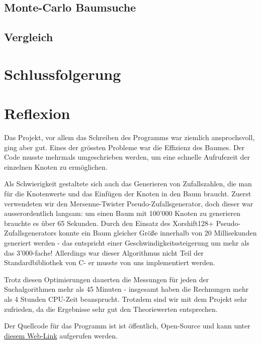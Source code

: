 \documentclass[a4paper,11pt]{article}
\newcommand{\CC}{C\nolinebreak\hspace{-.05em}\raisebox{.4ex}{\tiny\bf +}\nolinebreak\hspace{-.10em}\raisebox{.4ex}{\tiny\bf +}\hspace{.1em}}
\begin{document}
\subsection{Monte-Carlo Baumsuche}

\subsection{Vergleich}

\section{Schlussfolgerung}
\section{Reflexion}
Das Projekt, vor allem das Schreiben des Programms war ziemlich ansprochsvoll, ging aber gut. Eines der grössten Probleme war die Effizienz des Baumes. Der Code musste mehrmals umgeschrieben werden, um eine schnelle Aufrufezeit der einzelnen Knoten zu ermöglichen.

Als Schwierigkeit gestaltete sich auch das Generieren von Zufallszahlen, die man für die Knotenwerte und das Einfügen der Knoten in den Baum braucht. Zuerst verwendeten wir den Mersenne-Twister Pseudo-Zufallsgenerator, doch dieser war ausserordentlich langsam: um einen Baum mit 100'000 Knoten zu generieren brauchte es über 65 Sekunden. Durch den Einsatz des Xorshift128+ Pseudo-Zufallsgenerators konnte ein Baum gleicher Größe innerhalb von 20 Millisekunden generiert werden - das entspricht einer Geschwindigkeitssteigerung um mehr als das 3'000-fache! Allerdings war dieser Algorithmus nicht Teil der Standardbibliothek von \CC - er musste von uns implementiert werden.

Trotz diesen Optimierungen dauerten die Messungen für jeden der Suchalgorithmen mehr als 45 Minuten - insgesamt haben die Rechnungen mehr als 4 Stunden CPU-Zeit beansprucht. Trotzdem sind wir mit dem Projekt sehr zufrieden, da die Ergebnisse sehr gut den Theoriewerten entsprechen.

Der Quellcode für das Programm ist ist öffentlich, Open-Source und kann unter \href{https://github.com/Kepler-69c/binaryTree}{diesem Web-Link} aufgerufen werden.

\pagebreak


\end{document}
